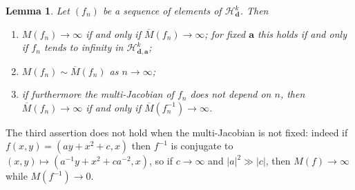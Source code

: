\documentclass[oneside, 12pt]{amsart}
\newcommand{\abs}[1]{\left\vert#1\right\vert}
\newcommand{\inv}{^{-1}}
\theoremstyle{plain}
\newtheorem{lem}[thm]{Lemma}
\theoremstyle{definition}
\numberwithin{equation}{section}       %
\numberwithin{equation}{section}       %
\begin{document}
\begin{lem}\label{lem:M}
Let $(f_n)$ be a sequence of elements of $\mathcal H_{\mathbf d}^k$.  Then
\begin{enumerate}[\rm (1)]
\item $M(f_n)\to \infty$ if and only if $\overline M(f_n)\to \infty$;  for fixed $\mathbf{a}$ this holds if and only if $f_n$ tends to infinity in $\mathcal H_{\mathbf d, \mathbf a}^k$; 

\item   $M(f_n)\sim \overline M(f_n)$ as $n\to \infty$;

\item if furthermore the multi-Jacobian of $f_n$ does not depend on $n$, then 
$\overline M(f_n)\to\infty$ if and only if $\overline M(f_n\inv )\to \infty$. 
\end{enumerate}
\end{lem}

The third assertion does not hold when the multi-Jacobian is not fixed:
indeed if $f(x,y) = (ay + x^2+c, x)$ then $f\inv$ is conjugate to 
$(x,y)\mapsto (a\inv y + x^2+ ca^{-2}, x)$, so if $c\to \infty$ and $\abs{a}^2 \gg \abs{c}$, then 
$M(f)\to\infty$ while 
$M(f\inv) \to 0$.  
\end{document}
